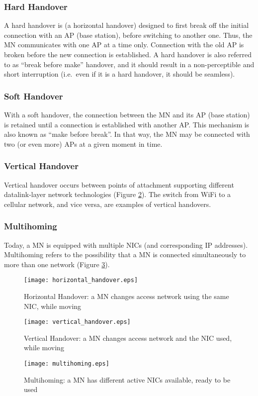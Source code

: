 \documentclass[preprint,12pt]{elsarticle}
\begin{document}
\subsubsection*{Hard Handover}
A hard handover is (a horizontal handover) designed to first break off the 
initial connection with an 
AP (base station), before switching to another one. Thus, the 
MN communicates with one AP at a time only. Connection with 
the old AP is broken before the new connection is established. 
A hard handover is also referred to as ``break before make'' handover, and it 
should result in a non-perceptible and short interruption 
(i.e.~even if it is a hard handover, it should be seamless).
\subsubsection*{Soft Handover}
With a soft handover, the connection between the MN and its AP (base station) is retained until a connection is established with another AP. This mechanism is also known as “make before break”. In that way, the MN may be connected with two (or even more) APs at a given moment in time.
\subsubsection*{Vertical Handover}
Vertical handover occurs between points of attachment supporting different 
datalink-layer network technologies (Figure \ref{fig:v_handover}). The switch 
from WiFi to a cellular network, and vice versa, are examples of vertical handovers.
\subsubsection*{Multihoming}
Today, a MN is equipped with multiple NICs (and corresponding IP addresses). 
Multihoming refers to the possibility that a MN is connected simultaneously to 
more than one network (Figure \ref{fig:mhoming}). 

\begin{figure}[th]
   \centering
   \texttt{[image: horizontal\_handover.eps]}
\caption{Horizontal Handover: a MN changes access network using the same NIC, 
while moving}
   \label{fig:h_handover}
\end{figure}
\begin{figure}[th]
   \centering
   \texttt{[image: vertical\_handover.eps]}
\caption{Vertical Handover: a MN changes access network and the NIC used, while 
moving}
   \label{fig:v_handover}
\end{figure}
\begin{figure}[th]
   \centering
   \texttt{[image: multihoming.eps]}
\caption{Multihoming: a MN has different active NICs available, ready to be 
used}
   \label{fig:mhoming}
\end{figure}
\end{document}
